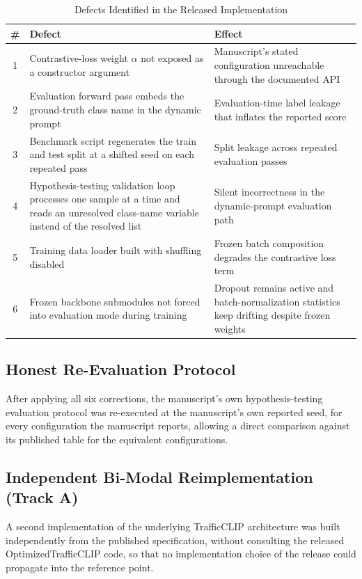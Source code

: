 \documentclass[journal]{IEEEtran}
\begin{document}
\begin{table}[t]
\caption{Defects Identified in the Released Implementation}
\label{tab:defects}
\centering
\renewcommand{\arraystretch}{1.25}
\begin{tabular}{|c|p{3.1cm}|p{3.3cm}|}
\hline
\textbf{\#} & \textbf{Defect} & \textbf{Effect} \\
\hline
1 & Contrastive-loss weight $\alpha$ not exposed as a constructor argument & Manuscript's stated configuration unreachable through the documented API \\
\hline
2 & Evaluation forward pass embeds the ground-truth class name in the dynamic prompt & Evaluation-time label leakage that inflates the reported score \\
\hline
3 & Benchmark script regenerates the train and test split at a shifted seed on each repeated pass & Split leakage across repeated evaluation passes \\
\hline
4 & Hypothesis-testing validation loop processes one sample at a time and reads an unresolved class-name variable instead of the resolved list & Silent incorrectness in the dynamic-prompt evaluation path \\
\hline
5 & Training data loader built with shuffling disabled & Frozen batch composition degrades the contrastive loss term \\
\hline
6 & Frozen backbone submodules not forced into evaluation mode during training & Dropout remains active and batch-normalization statistics keep drifting despite frozen weights \\
\hline
\end{tabular}
\end{table}

\subsection{Honest Re-Evaluation Protocol}
After applying all six corrections, the manuscript's own hypothesis-testing evaluation protocol was re-executed at the manuscript's own reported seed, for every configuration the manuscript reports, allowing a direct comparison against its published table for the equivalent configurations.

\subsection{Independent Bi-Modal Reimplementation (Track A)}
A second implementation of the underlying TrafficCLIP architecture was built independently from the published specification, without consulting the released OptimizedTrafficCLIP code, so that no implementation choice of the release could propagate into the reference point.
\end{document}
